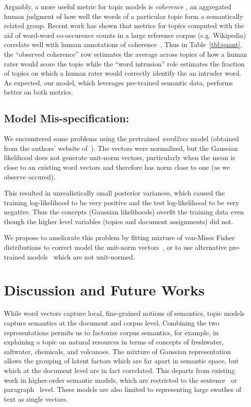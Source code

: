 \documentclass[11pt]{article}
\begin{document}
Arguably, a more useful metric for topic models is \emph{coherence} \cite{Chang09}, an aggregated human judgment of how well the words of a particular topic form a semantically related group. Recent work has shown that metrics for topics computed with the aid of word-word co-occurence counts in a large reference corpus (e.g. Wikipedia) correlate well with human annotations of coherence~\cite{Lau14}. Thus in Table~\ref{tbl:quant}, the ``observed coherence'' row estimates the average across topics of how a human rater would score the topic while the ``word intrusion'' role estimates the fraction of topics on which a human rater would correctly identify the an intruder word. As expected, our model, which leverages pre-trained semantic data, performs better on both metrics.

\subsection{Model Mis-specification:}
\label{sec:misspec}
We encountered some problems using the pretrained \emph{word2vec} model (obtained from the authors' website of~\cite{Mikolov13a}). The vectors were normalized, but the Gaussian likelihood does not generate unit-norm vectors, particularly when the mean is close to an existing word vectors and therefore has norm close to one (as we observe occured).

This resulted in unrealistically small posterior variances, which caused the training log-likelihood to be very positive and the test log-likelihood to be very negative. Thus the concepts (Gaussian likelihoods) overfit the training data even though the higher level variables (topics and document assignments) did not.

We propose to ameliorate this problem by fitting mixture of von-Mises Fisher distributions to correct model the unit-norm vectors~\cite{Dhillon03b}, or to use alternative pre-trained models~\cite{Pennington14} which are not unit-normed.

\section{Discussion and Future Works}
While word vectors capture local, fine-grained notions of semantics, topic models capture semantics at the document and corpus level. Combining the two representations permits us to factorize corpus semantics, for example, in explaining a topic on natural resources in terms of concepts of freshwater, saltwater, chemicals, and volcanoes. The mixture of Gaussian representation allows the grouping of latent factors which are far apart in semantic space, but which at the document level are in fact correlated. This departs from existing work in higher-order semantic models, which are restricted to the sentence~\cite{Socher13a} or paragraph~\cite{Le14q} level. These models are also limited to representing large swathes of text as single vectors.
\end{document}
